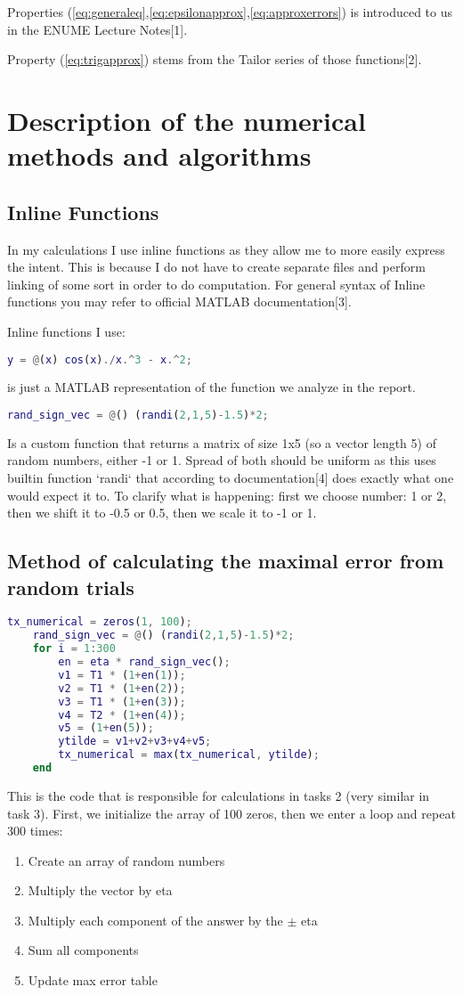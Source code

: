 \documentclass[11pt]{article}
\begin{document}
Properties (\ref{eq:generaleq},\ref{eq:epsilonapprox},\ref{eq:approxerrors})
is introduced to us in the ENUME Lecture Notes[1].

Property (\ref{eq:trigapprox}) stems from the Tailor series of those functions[2].

\section{Description of the numerical methods and algorithms}
\subsection{Inline Functions}
In my calculations I use inline functions as they allow me to more easily
express the intent. This is because I do not have to create separate files and
perform linking of some sort in order to do computation. For general syntax of
Inline functions you may refer to official MATLAB documentation[3].

Inline functions I use:
\begin{lstlisting}[language=MATLAB]
    y = @(x) cos(x)./x.^3 - x.^2;
\end{lstlisting}
is just a MATLAB representation of the function we analyze in the report.
\begin{lstlisting}[language=MATLAB]
    rand_sign_vec = @() (randi(2,1,5)-1.5)*2;
\end{lstlisting}
Is a custom function that returns a matrix of size 1x5 (so a vector length 5)
of random numbers, either -1 or 1. Spread of both should be uniform as this uses
builtin function `randi` that according to documentation[4] does exactly what one
would expect it to. To clarify what is happening: first we choose number: 1 or 2,
then we shift it to -0.5 or 0.5, then we scale it to -1 or 1.

\subsection{Method of calculating the maximal error from random trials}
\begin{lstlisting}[language=MATLAB]
    tx_numerical = zeros(1, 100);
    rand_sign_vec = @() (randi(2,1,5)-1.5)*2;
    for i = 1:300
        en = eta * rand_sign_vec();
        v1 = T1 * (1+en(1));
        v2 = T1 * (1+en(2));
        v3 = T1 * (1+en(3));
        v4 = T2 * (1+en(4));
        v5 = (1+en(5));
        ytilde = v1+v2+v3+v4+v5;
        tx_numerical = max(tx_numerical, ytilde);
    end
\end{lstlisting}
This is the code that is responsible for calculations in tasks 2 (very similar in task 3). 
First, we initialize the array of 100 zeros, then we enter a loop and repeat 300 times:
\begin{enumerate}
    \item Create an array of random numbers
    \item Multiply the vector by eta
    \item Multiply each component of the answer by the $\pm$ eta
    \item Sum all components
    \item Update max error table
\end{enumerate}
\end{document}

